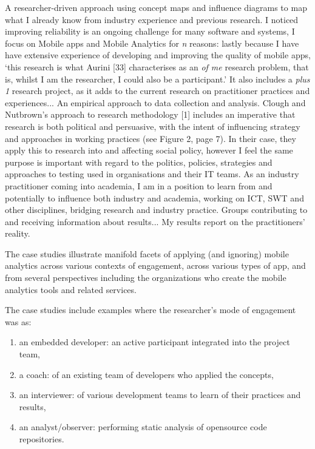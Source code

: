 A researcher-driven approach using concept maps and inﬂuence diagrams to map what I already know from industry experience and previous research. I noticed improving reliability is an ongoing challenge for many software and systems, I focus on Mobile apps and Mobile Analytics for \textit{n} reasons: lastly because I have have extensive experience of developing and improving the quality of mobile apps, `this research is what Aurini [33] characterises as an \textit{of me} research problem, that is, whilst I am the researcher, I could also be a participant.' It also includes a \textit{plus 1} research project, as it adds to the current research on practitioner practices and experiences... An empirical approach to data collection and analysis. 
%
Clough and Nutbrown’s approach to research methodology [1] includes an imperative that research is both political and persuasive, with the intent of inﬂuencing strategy and approaches in working practices (see Figure 2, page 7). In their case, they apply this to research into and aﬀecting social policy, however I feel the same purpose is important with regard to the politics, policies, strategies and approaches to testing used in organisations and their IT teams. As an industry practitioner coming into academia, I am in a position to learn from and potentially to inﬂuence both industry and academia, working on ICT, SWT and other disciplines, bridging research and industry practice.
%
Groups contributing to and receiving information about results...
%
My results report on the practitioners' reality.

The case studies illustrate manifold facets of applying (and ignoring) mobile analytics across various contexts of engagement, across various types of app, and from several perspectives including the organizations who create the mobile analytics tools and related services.

The case studies include examples where the researcher's mode of engagement was as:
\begin{enumerate}
    \itemsep0em
    \item an embedded developer: an active participant integrated into the project team,
    \item a coach: of an existing team of developers who applied the concepts,
    \item an interviewer: of various development teams to learn of their practices and results,
    \item an analyst/observer: performing static analysis of opensource code repositories.
\end{enumerate}

